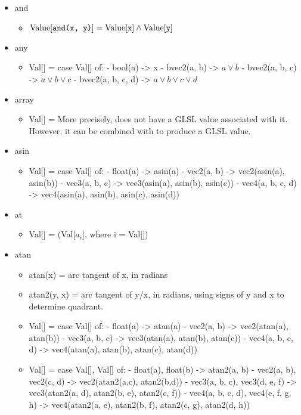 \documentclass{article}
\begin{document}
\begin{itemize}
\begin{itemize}
\end{itemize}\item and \begin{itemize}
\item $\textrm{Value}[\texttt{and(x, y)}] = \textrm{Value}[\texttt{x}] \land \textrm{Value}[\texttt{y}]$

\end{itemize}\item any \begin{itemize}
\item Val[] = case Val[] of:
    - bool(a) -> x
    - bvec2(a, b) -> $a \lor b$
    - bvec2(a, b, c) -> $a \lor b \lor c$
    - bvec2(a, b, c, d) -> $a \lor b \lor c \lor d$

\end{itemize}\item array \begin{itemize}
\item Val[] = 
  More precisely,  does not have a GLSL value associated with
  it. However, it can be combined with  to
  produce a GLSL value.

\end{itemize}\item asin \begin{itemize}
\item Val[] = case Val[] of:
    - float(a) -> asin(a)
    - vec2(a, b) -> vec2(asin(a), asin(b))
    - vec3(a, b, c) -> vec3(asin(a), asin(b), asin(c))
    - vec4(a, b, c, d) -> vec4(asin(a), asin(b), asin(c), asin(d))

\end{itemize}\item at \begin{itemize}
\item Val[\C{at(array([$a_0, a_1, \ldots..., a_n$), index)}] = (Val[$a_i$], where i = Val[])

\end{itemize}\item atan \begin{itemize}
\item atan(x) = arc tangent of x, in radians
\item atan2(y, x) = arc tangent of y/x, in radians, using signs of y and x to determine quadrant.
\item Val[] = case Val[] of:
    - float(a) -> atan(a)
    - vec2(a, b) -> vec2(atan(a), atan(b))
    - vec3(a, b, c) -> vec3(atan(a), atan(b), atan(c))
    - vec4(a, b, c, d) -> vec4(atan(a), atan(b), atan(c), atan(d))
\item Val[] = case Val[], Val[] of:
    - float(a), float(b) -> atan2(a, b)
    - vec2(a, b), vec2(c, d) -> vec2(atan2(a,c), atan2(b,d))
    - vec3(a, b, c), vec3(d, e, f) -> vec3(atan2(a, d), atan2(b, e), atan2(c, f))
    - vec4(a, b, c, d), vec4(e, f, g, h) -> vec4(atan2(a, e), atan2(b, f), atan2(c, g), atan2(d, h))


\end{itemize}
\end{itemize}
\end{document}
